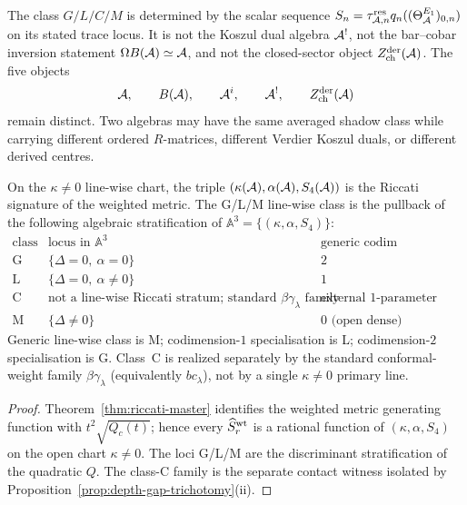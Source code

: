 \begin{remark}
\label{rem:shadow-class-not-duality-bulk}
The class $G/L/C/M$ is determined by the scalar sequence
$S_n=\tau_{\mathcal{A},n}^{\mathrm{res}}
q_n((\Theta_{\mathcal{A}}^{E_1})_{0,n})$ on its stated trace locus. It is not the Koszul dual algebra $\mathcal{A}^!$, not
the bar--cobar inversion statement $\Omega B(\mathcal{A})\simeq\mathcal{A}$, and not
the closed-sector object
$Z^{\mathrm{der}}_{\mathrm{ch}}(\mathcal{A})$. The five objects
\[
\mathcal{A},\qquad B(\mathcal{A}),\qquad \mathcal{A}^i,\qquad \mathcal{A}^!,\qquad
Z^{\mathrm{der}}_{\mathrm{ch}}(\mathcal{A})
\]
remain distinct. Two algebras may have the same averaged shadow class
while carrying different ordered $R$-matrices, different Verdier
Koszul duals, or different derived centres.
\end{remark}

\begin{proposition}
\label{prop:moduli-stratification-codim}
\ClaimStatusConditional
On the $\kappa\neq0$ line-wise chart, the triple
$(\kappa(\mathcal{A}),\alpha(\mathcal{A}),S_4(\mathcal{A}))$ is the Riccati signature of the
weighted metric. The G/L/M line-wise class is the pullback of the
following algebraic stratification of
$\mathbb A^{3}=\{(\kappa,\alpha,S_4)\}$:
\[
\begin{array}{l|l|l}
\text{class} & \text{locus in } \mathbb A^{3} & \text{generic codim} \\
\hline
\text{G} & \{\Delta = 0,\ \alpha = 0\} & 2 \\
\text{L} & \{\Delta = 0,\ \alpha \neq 0\} & 1 \\
\text{C} & \text{not a line-wise Riccati stratum; standard } \beta\gamma_\lambda \text{ family} & \text{external 1-parameter family} \\
\text{M} & \{\Delta \neq 0\} & 0 \text{ (open dense)}
\end{array}
\]
Generic line-wise class is M; codimension-$1$ specialisation is L;
codimension-$2$ specialisation is G. Class~C is realized separately by
the standard conformal-weight family
$\beta\gamma_\lambda$ \textup{(}equivalently $bc_\lambda$\textup{)},
not by a single $\kappa \neq 0$ primary line.
\end{proposition}

\begin{proof}
Theorem~\ref{thm:riccati-master} identifies the weighted metric
generating function with $t^2\sqrt{Q_c(t)}$; hence every
$\widehat S^{\rm wt}_r$ is a rational function of
$(\kappa,\alpha,S_4)$ on the open chart $\kappa\ne0$. The loci G/L/M
are the discriminant stratification of the quadratic $Q$. The
class-C family is the separate contact witness isolated by
Proposition~\ref{prop:depth-gap-trichotomy}(ii).
\end{proof}

